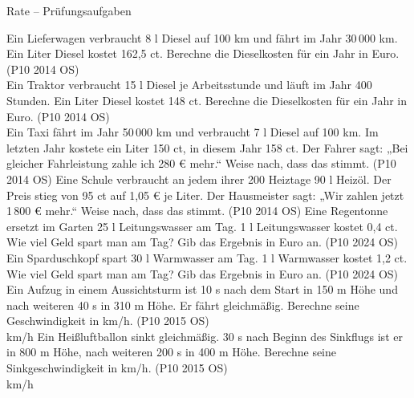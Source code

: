 \begin{aufgabe}{Rate – Prüfungsaufgaben}
\begin{teile}
\teil Ein Lieferwagen verbraucht 8 l Diesel auf 100 km und fährt im Jahr 30\,000 km. Ein Liter Diesel kostet 162,5 ct. Berechne die Dieselkosten für ein Jahr in Euro. \hfill (P10 2014 OS) \\ \leerfeld[€]
\teil Ein Traktor verbraucht 15 l Diesel je Arbeitsstunde und läuft im Jahr 400 Stunden. Ein Liter Diesel kostet 148 ct. Berechne die Dieselkosten für ein Jahr in Euro. \hfill (P10 2014 OS) \\ \leerfeld[€]
\teil Ein Taxi fährt im Jahr 50\,000 km und verbraucht 7 l Diesel auf 100 km. Im letzten Jahr kostete ein Liter 150 ct, in diesem Jahr 158 ct. Der Fahrer sagt: „Bei gleicher Fahrleistung zahle ich 280 € mehr.“ Weise nach, dass das stimmt. \hfill (P10 2014 OS)
\teil Eine Schule verbraucht an jedem ihrer 200 Heiztage 90 l Heizöl. Der Preis stieg von 95 ct auf 1,05 € je Liter. Der Hausmeister sagt: „Wir zahlen jetzt 1\,800 € mehr.“ Weise nach, dass das stimmt. \hfill (P10 2014 OS)
\teil Eine Regentonne ersetzt im Garten 25 l Leitungswasser am Tag. 1 l Leitungswasser kostet 0,4 ct. Wie viel Geld spart man am Tag? Gib das Ergebnis in Euro an. \hfill (P10 2024 OS) \\ \leerfeld[€]
\teil Ein Sparduschkopf spart 30 l Warmwasser am Tag. 1 l Warmwasser kostet 1,2 ct. Wie viel Geld spart man am Tag? Gib das Ergebnis in Euro an. \hfill (P10 2024 OS) \\ \leerfeld[€]
\steil Ein Aufzug in einem Aussichtsturm ist 10 s nach dem Start in 150 m Höhe und nach weiteren 40 s in 310 m Höhe. Er fährt gleichmäßig. Berechne seine Geschwindigkeit in km/h. \hfill (P10 2015 OS) \\ \leerfeld km/h
\steil Ein Heißluftballon sinkt gleichmäßig. 30 s nach Beginn des Sinkflugs ist er in 800 m Höhe, nach weiteren 200 s in 400 m Höhe. Berechne seine Sinkgeschwindigkeit in km/h. \hfill (P10 2015 OS) \\ \leerfeld km/h
\end{teile}
\end{aufgabe}

